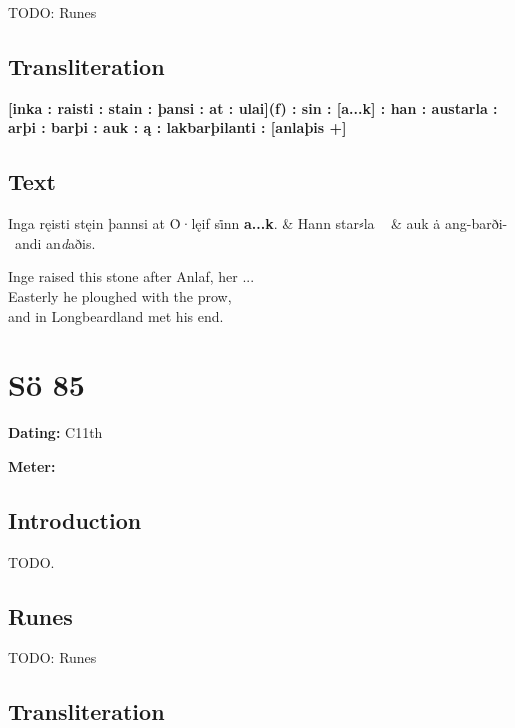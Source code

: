 TODO: Runes%

\subsection{Transliteration}

\textbf{[inka : raisti : stain : þansi : at : ulai](f) : sin : [a...k] : han : austarla : arþi : barþi : auk : ą : lakbarþilanti : [anlaþis +]}

\subsection{Text}

\bvg\bva[]%
Inga ręisti stęin þannsi at Ȯ·lęif si̇nn \textbf{a...k}. &
Hann star⸗la \hld\  &
auk ȧ ang-barði- \hld\ andi an\emph{d}aðis.\eva

\bvb Inge raised this stone after Anlaf, her ... \\
Easterly he ploughed with the prow, \\
and in Longbeardland met his end.\evb\evg

\sectionline\clearpage


\section{Sö 85}

\begin{flushright}%
\textbf{Dating:} C11th

\textbf{Meter:} \Fornyrdislag
\end{flushright}%

\subsection{Introduction}

TODO.

\subsection{Runes}

TODO: Runes%

\subsection{Transliteration}

